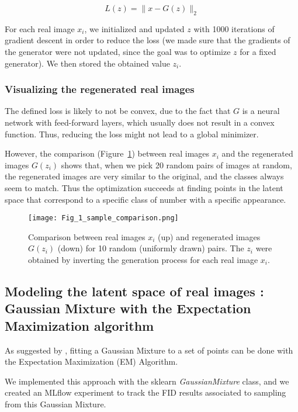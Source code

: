 \documentclass[10pt]{article}
\begin{document}
\[
L(z) = \| x - G(z) \|_2
\]

For each real image $x_{i}$, we initialized and updated $z$ with 1000 iterations of gradient descent in order to reduce the loss (we made sure that the gradients of the generator were not updated, since the goal was to optimize $z$ for a fixed generator). We then stored the obtained value $z_{i}$.

\subsubsection{Visualizing the regenerated real images}

The defined loss is likely to not be convex, due to the fact that $G$ is a neural network with feed-forward layers, which usually does not result in a convex function. Thus, reducing the loss might not lead to a global minimizer.

However, the comparison (Figure~\ref{fig:fig_1}) between real images $x_{i}$ and the regenerated images $G(z_{i})$ shows that, when we pick 20 random pairs of images at random, the regenerated images are very similar to the original, and the classes always seem to match. Thus the optimization succeeds at finding points in the latent space that correspond to a specific class of number with a specific appearance.

\begin{figure}[H]
\centering
\texttt{[image: Fig\_1\_sample\_comparison.png]} %
\caption{Comparison between real images $x_{i}$ (up) and regenerated images $G(z_{i})$ (down) for 10 random (uniformly drawn) pairs. The $z_i$ were obtained by inverting the generation process for each real image $x_i$.}
\label{fig:fig_1}
\end{figure}

\subsection{Modeling the latent space of real images : Gaussian Mixture with the Expectation Maximization algorithm}

As suggested by \citep{ref_key}, fitting a Gaussian Mixture to a set of points can be done with the Expectation Maximization (EM) Algorithm.

We implemented this approach with the sklearn \textit{GaussianMixture} class, and we created an MLflow experiment to track the FID results associated to sampling from this Gaussian Mixture.
\end{document}
